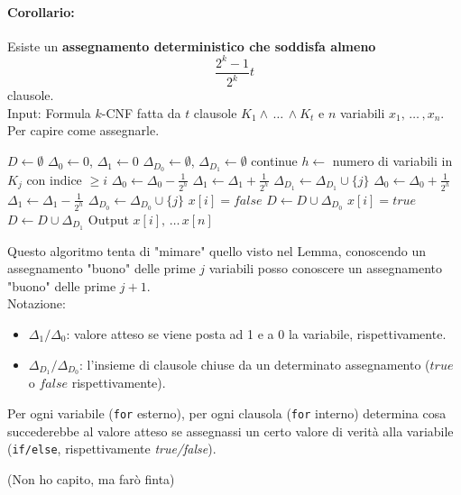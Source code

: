 \paragraph{Corollario:} Esiste un \textbf{assegnamento deterministico che soddisfa almeno} 
$$ \frac{2^k - 1}{2^k} t$$
clausole.\\
Input: Formula $k$-CNF fatta da $t$ clausole $K_1 \wedge \, \dots \, \wedge K_t$ e $n$ variabili $x_1, \, \dots \, , x_n$.\\
Per capire come assegnarle.\\
\begin{algorithmic}
	\STATE $D \leftarrow \emptyset$
		\STATE $\Delta_0 \leftarrow 0$, $\Delta_1 \leftarrow 0$
		\STATE $\Delta_{D_0} \leftarrow \emptyset$, $\Delta_{D_1} \leftarrow \emptyset$
				\STATE continue
			\ENDIF
			\STATE $h \leftarrow$ numero di variabili in $K_j$ con indice $\geq i$
				\STATE $\Delta_0 \leftarrow \Delta_0 - \frac{1}{2^h}$
				\STATE $\Delta_1 \leftarrow \Delta_1 + \frac{1}{2^h}$
				\STATE $\Delta_{D_1} \leftarrow \Delta_{D_1} \cup \{j\}$
			\ELSE
				\STATE $\Delta_0 \leftarrow \Delta_0 + \frac{1}{2^h}$
				\STATE $\Delta_1 \leftarrow \Delta_1 - \frac{1}{2^h}$
				\STATE $\Delta_{D_0} \leftarrow \Delta_{D_0} \cup \{j\}$
			\ENDIF
		\ENDFOR
			\STATE $x[i] = false$
			\STATE $D \leftarrow D \cup \Delta_{D_0}$
		\ELSE
			\STATE $x[i] = true$
			\STATE $D \leftarrow D \cup \Delta_{D_1}$
		\ENDIF
	\ENDFOR
	\STATE Output $x[i], \, \dots \, x[n]$
\end{algorithmic}

\newpage

Questo algoritmo tenta di "mimare" quello visto nel Lemma, conoscendo un assegnamento "buono" delle prime $j$ variabili posso conoscere un assegnamento "buono" delle prime $j+1$.\\

Notazione:
\begin{itemize}
	\item $\Delta_1/\Delta_0$: valore atteso se viene posta ad 1 e a 0 la variabile, rispettivamente.\\
	
	\item $\Delta_{D_1}/\Delta_{D_0}$: l'insieme di clausole chiuse da un determinato assegnamento ($true$ o $false$ rispettivamente).\\
\end{itemize}

Per ogni variabile (\texttt{for} esterno), per ogni clausola (\texttt{for} interno) determina cosa succederebbe al valore atteso se assegnassi un certo valore di verità alla variabile (\texttt{if/else}, rispettivamente \textit{true/false}).\\

\vfill

(Non ho capito, ma farò finta)

\newpage

